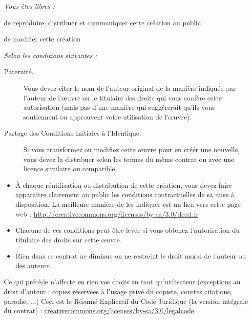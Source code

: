 \documentclass[a4paper,10pt,twoside]{book}
\begin{document}
\begin{footnotesize}
\emph{Vous \^etes libres :}
\begin{description}
  \item de reproduire, distribuer et communiquer cette cr\'eation au public
  \item de modifier cette cr\'eation
\end{description}
\emph{Selon les conditions suivantes :}
\begin{description}
  \item[Paternit\'e.] Vous devez citer le nom de l'auteur original de la mani\`ere indiqu\'ee par l'auteur de l'\oe{}uvre ou le titulaire des droits qui vous conf\`ere cette autorisation (mais pas d'une mani\`ere qui sugg\'ererait qu'ils vous soutiennent ou approuvent votre utilisation de l'\oe{}uvre).
  \item[Partage des Conditions Initiales \`a l'Identique.] Si vous transformez ou modifiez cette \oe{}uvre pour en cr\'e\'er une nouvelle, vous devez la distribuer selon les termes du m\^eme contrat ou avec une licence similaire ou compatible.
\end{description}
\begin{itemize}
  \item \`A chaque r\'eutilisation ou distribution de cette cr\'eation, vous devez faire appara\^itre clairement au public les conditions contractuelles de sa mise \'a disposition. La meilleure mani\`ere de les indiquer est un lien vers cette page web :
  \url{http://creativecommons.org/licenses/by-sa/3.0/deed.fr}
  \item Chacune de ces conditions peut \^etre lev\'ee si vous obtenez l'autorisation du titulaire des droits sur cette \oe{}uvre.
  \item Rien dans ce contrat ne diminue ou ne restreint le droit moral de l'auteur ou des auteurs.
\end{itemize}
\quad
\parbox{\textwidth-2cm-1em}{
	Ce qui pr\'ec\`ede n'affecte en rien vos droits en tant qu'utilisateur (exceptions au droit d'auteur : copies r\'eserv\'ees \`a l'usage priv\'e du copiste, courtes citations, parodie, ...)
	Ceci est le R\'esum\'e Explicatif du Code Juridique (la version int\'egrale du contrat) :	\url{creativecommons.org/licenses/by-sa/3.0/legalcode}}
\end{footnotesize}
\vfill
\tableofcontents
\sloppy %
\mainmatter
\end{document}
